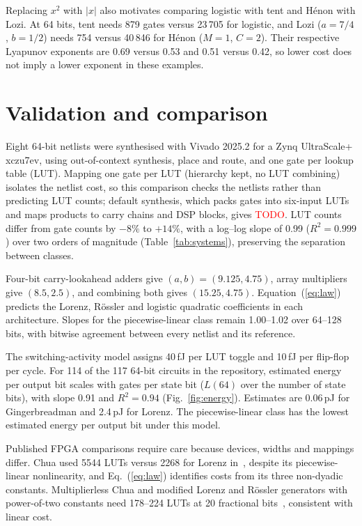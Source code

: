 \documentclass[ASNA,twocolumn]{USG}
\newcommand{\todo}{\textcolor{red}{TODO}}
\begin{document}
Replacing $x^2$ with $|x|$ also motivates comparing logistic with tent and H\'enon
with Lozi. At 64 bits, tent needs 879 gates versus 23\,705 for logistic, and
Lozi ($a=7/4$, $b=1/2$) needs 754 versus 40\,846 for H\'enon ($M=1$, $C=2$).
Their respective Lyapunov exponents are 0.69 versus 0.53 and 0.51 versus 0.42,
so lower cost does not imply a lower exponent in these examples.

\section{Validation and comparison}\label{sec:validation}
Eight 64-bit netlists were synthesised with Vivado 2025.2 for a Zynq UltraScale+
xczu7ev, using out-of-context synthesis, place and route, and one gate per lookup
table (LUT). Mapping one gate per LUT (hierarchy kept, no LUT combining) isolates the
netlist cost, so this comparison checks the netlists rather than predicting
LUT counts; default synthesis, which packs gates into six-input LUTs and maps
products to carry chains and DSP blocks, gives %
\todo. LUT counts differ from gate counts by $-8\%$ to $+14\%$, with
a log--log slope of 0.99 ($R^2=0.999$) over two orders of magnitude
(Table~\ref{tab:systems}), preserving the separation between classes.

Four-bit carry-lookahead adders give $(a,b)=(9.125,4.75)$, array multipliers give
$(8.5,2.5)$, and combining both gives $(15.25,4.75)$. Equation~(\ref{eq:law}) predicts
the Lorenz, R\"ossler and logistic quadratic coefficients in each architecture.
Slopes for the piecewise-linear class remain 1.00--1.02 over 64--128 bits, with bitwise agreement
between every netlist and its reference.

The switching-activity model assigns 40\,fJ per LUT toggle and 10\,fJ per flip-flop
per cycle. For 114 of the 117 64-bit circuits in the repository,
estimated energy per output bit scales with gates per state bit ($L(64)$ over the number
of state bits), with slope 0.91 and
$R^2=0.94$ (Fig.~\ref{fig:energy}). Estimates are 0.06\,pJ for Gingerbreadman
and 2.4\,pJ for Lorenz. The piecewise-linear class has the lowest estimated
energy per output bit under this model.

Published FPGA comparisons require care because devices, widths and mappings differ.
Chua used 5544 LUTs versus 2268 for Lorenz in~\cite{indrusiak2005}, despite its
piecewise-linear nonlinearity, and Eq.~(\ref{eq:law}) identifies costs from its three
non-dyadic constants. Multiplierless Chua and modified Lorenz and R\"ossler generators with
power-of-two constants need 178--224 LUTs at 20 fractional bits~\cite{rezk2020},
consistent with linear cost.
\end{document}
